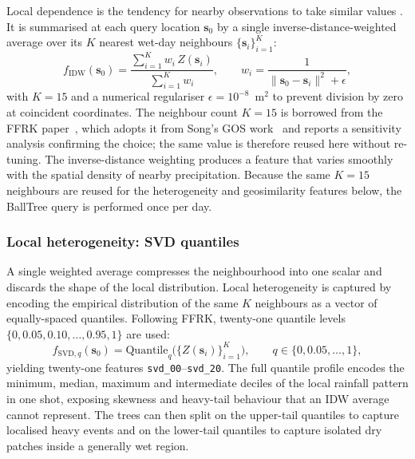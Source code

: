 Local dependence is the tendency for nearby observations to take
similar values \cite{luo2025featurefree}. It is summarised at each
query location $\mathbf{s}_0$ by a single inverse-distance-weighted
average over its $K$ nearest wet-day neighbours
$\{\mathbf{s}_i\}_{i=1}^{K}$:
\begin{equation}
  f_{\mathrm{IDW}}(\mathbf{s}_0)
    = \frac{\sum_{i=1}^{K} w_i\, Z(\mathbf{s}_i)}{\sum_{i=1}^{K} w_i},
  \qquad
  w_i = \frac{1}{\|\mathbf{s}_0 - \mathbf{s}_i\|^{2} + \epsilon},
  \label{eq:lgbm-idw}
\end{equation}
with $K = 15$ and a numerical regulariser $\epsilon = 10^{-8}$~m$^2$
to prevent division by zero at coincident coordinates. The neighbour
count $K = 15$ is borrowed from the FFRK
paper~\cite{luo2025featurefree}, which adopts it from Song's GOS
work~\cite{song2022gos} and reports a sensitivity analysis confirming
the choice; the same value is therefore reused here without
re-tuning. The inverse-distance weighting produces a feature that
varies smoothly with the spatial density of nearby precipitation.
Because the same $K = 15$ neighbours are reused for the
heterogeneity and geosimilarity features below, the BallTree query
is performed once per day.

\subsubsection*{Local heterogeneity: SVD quantiles}
\label{sec:lgbm-svd}

A single weighted average compresses the neighbourhood into one
scalar and discards the shape of the local distribution. Local
heterogeneity is captured by encoding the empirical distribution of
the same $K$ neighbours as a vector of equally-spaced quantiles.
Following FFRK, twenty-one quantile levels
$\{0, 0{.}05, 0{.}10, \ldots, 0{.}95, 1\}$ are used:
\begin{equation}
  f_{\mathrm{SVD},q}(\mathbf{s}_0)
    = \mathrm{Quantile}_{q}\!\bigl(
        \{Z(\mathbf{s}_i)\}_{i=1}^{K}
      \bigr),
  \qquad q \in \{0, 0{.}05, \ldots, 1\},
  \label{eq:lgbm-svd}
\end{equation}
yielding twenty-one features \texttt{svd\_00}--\texttt{svd\_20}. The
full quantile profile encodes the minimum, median, maximum and
intermediate deciles of the local rainfall pattern in one shot,
exposing skewness and heavy-tail behaviour that an IDW average cannot
represent. The trees can then split on the upper-tail quantiles to
capture localised heavy events and on the lower-tail quantiles to
capture isolated dry patches inside a generally wet region.

